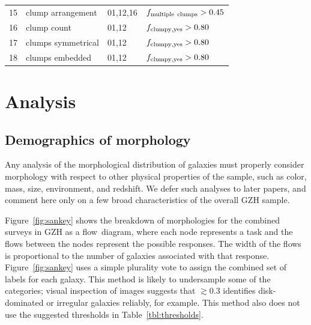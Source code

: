 \documentclass[twocolumn]{aastex6}
\begin{document}
\begin{table}
\begin{tabular}{llll}
15       & clump arrangement    & 01,12,16         & $f_{\rm multiple~clumps}>0.45$     \\
16       & clump count          & 01,12            & $f_{\rm clumpy,yes}>0.80$          \\
17       & clumps symmetrical   & 01,12            & $f_{\rm clumpy,yes}>0.80$          \\
18       & clumps embedded      & 01,12            & $f_{\rm clumpy,yes}>0.80$          \\
\hline\hline
\end{tabular}
\end{table}

\section{Analysis}\label{sec:analysis}


\subsection{Demographics of morphology}

Any analysis of the morphological distribution of galaxies must properly
consider morphology with respect to other physical properties of the sample,
such as color, mass, size, environment, and redshift. We defer such analyses to
later papers, and comment here only on a few broad characteristics of the
overall GZH sample. 

Figure~\ref{fig:sankey} shows the breakdown of morphologies for the combined
surveys in GZH as a flow~diagram, where each node represents a task and the
flows between the nodes represent the possible responses. The width of the
flows is proportional to the number of galaxies associated with that response.
Figure~\ref{fig:sankey} uses a simple plurality vote to assign the combined set
of labels for each galaxy. This method is likely to undersample some of the
categories; visual inspection of images suggests that \ffeatures$\gtrsim0.3$
identifies disk-dominated or irregular galaxies reliably, for example. This
method also does not use the suggested thresholds in
Table~\ref{tbl:thresholds}. 
\end{document}
